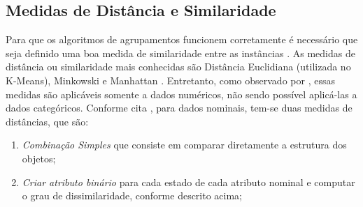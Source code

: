 \documentclass[tcc2]{classe_uftex/uftex}
\begin{document}
     \subsection{Medidas de Distância e Similaridade}
     \label{subsec:medidas}%
    Para que os algoritmos de agrupamentos funcionem corretamente é necessário que seja definido uma boa medida de similaridade entre as instâncias \cite{2013:chapman}. As medidas de distância ou similaridade mais conhecidas são Distância Euclidiana (utilizada no K-Means), Minkowski e Manhattan \cite{2007:Omran}. Entretanto, como observado por , essas medidas são aplicáveis somente a dados numéricos, não sendo possível aplicá-las a dados categóricos. Conforme cita , para dados nominais, tem-se duas medidas de distâncias, que são:
    \begin{enumerate}
        \item \emph{Combinação Simples} que consiste em comparar diretamente a estrutura dos objetos;
        \item \emph{Criar atributo binário} para cada estado de cada atributo nominal e computar o grau de dissimilaridade, conforme descrito acima;
    \end{enumerate}
    
    
\end{document}
